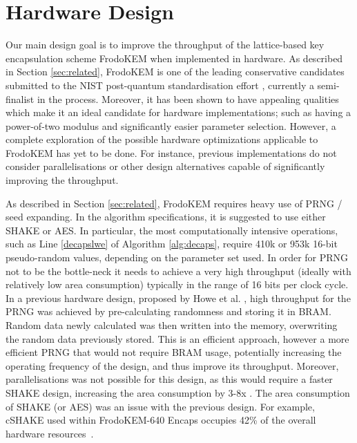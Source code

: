 \section{Hardware Design} \label{sec:design}

Our main design goal is to improve the throughput of the lattice-based key encapsulation scheme FrodoKEM \cite{frodokem} when implemented in hardware. As described in Section \ref{sec:related}, FrodoKEM is one of the leading conservative candidates submitted to the NIST post-quantum standardisation effort \cite{nistpq}, currently a semi-finalist in the process. Moreover, it has been shown to have appealing qualities which make it an ideal candidate for hardware implementations; such as having a power-of-two modulus and significantly easier parameter selection. However, a complete exploration of the possible hardware optimizations applicable to FrodoKEM has yet to be done. For instance, previous implementations do not consider parallelisations or other design alternatives capable of significantly improving the throughput.

As described in Section \ref{sec:related}, FrodoKEM requires heavy use of PRNG / seed expanding. In the algorithm specifications, it is suggested to use either SHAKE or AES. In particular, the most computationally intensive operations, such as Line \ref{decapslwe} of Algorithm \ref{alg:decaps}, require 410k or 953k 16-bit pseudo-random values, depending on the parameter set used. In order for PRNG not to be the bottle-neck it needs to achieve a very high throughput (ideally with relatively low area consumption) typically in the range of 16 bits per clock cycle. In a previous hardware design, proposed by Howe et al. \cite{howe2018standard}, high throughput for the PRNG was achieved by pre-calculating randomness and storing it in BRAM. Random data newly calculated was then written into the memory, overwriting the random data previously stored. This is an efficient approach, however a more efficient PRNG that would not require BRAM usage, potentially increasing the operating frequency of the design, and thus improve its throughput. Moreover, parallelisations was not possible for this design, as this would require a faster SHAKE design, increasing the area consumption by 3-8x \cite{bertoni2012keccak}. The area consumption of SHAKE (or AES) was an issue with the previous design. For example, cSHAKE used within FrodoKEM-640 Encaps occupies 42\% of the overall hardware resources~\cite{howe2018standard}. 

